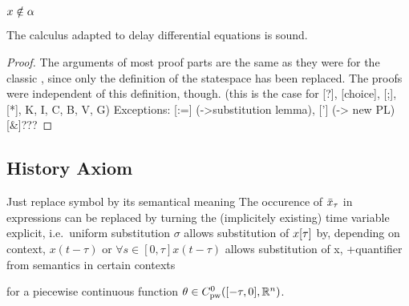 \documentclass[10pt]{report}
\begin{document}
\begin{calculus}
{{            }{
            }
        }{$x\notin\alpha$}
        \cinferenceRule[Vb|V]{}{
            \linferenceRule[impl]{
                \asfml
            }{
                \dbox{\asprg}{\asfml}
            }
        }{$\freevars{\asfml}\cap\boundvars{\asprg}=\emptyset$}
        \cinferenceRule[Gb|G]{}{
            \linferenceRule[sequent]{
                \asfml
            }{
                \dbox{\asprg}{\asfml}
            }
        }{}


    \end{calculus}

    \begin{theorem}[Soundness of \dL]
        \label{thm:dL-soundness}
        The \dL calculus adapted to delay differential equations is sound.

    \end{theorem}
    \begin{proof}
        The arguments of most proof parts are the same as they were for the classic \dL, since only the definition of the statespace has been replaced. The proofs were independent of this definition, though. (this is the case for [?], [choice], [;], [*], K, I, C, B, V, G)
        Exceptions: [:=] (->substitution lemma), ['] (-> new PL)
        [\&]???
    \end{proof}


    \subsection{History Axiom}
        \label{history-axiom}

        Just replace symbol by its semantical meaning
        The occurence of $\bar{x}_{\tau}$ in expressions can be replaced by turning the (implicitely existing) time variable explicit, i.e.\
        uniform substitution $\sigma$
        allows substitution of $x[\tau]$ by, depending on context, $x(t-\tau)$ or $\forall{s\in[0,\tau]}{x(t-\tau)}$
        allows substitution of x, +quantifier from semantics in certain contexts
        \begin{calculus}
        \end{calculus}
        for a piecewise continuous function $\theta\in\statespace$.
\end{document}
